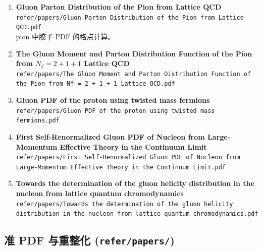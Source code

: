 \documentclass[12pt,a4paper]{ctexart}
\begin{document}
\begin{enumerate}
    \item \textbf{Gluon Parton Distribution of the Pion from Lattice QCD} \\
    \texttt{refer/papers/Gluon Parton Distribution of the Pion from Lattice QCD.pdf} \\
     pion 中胶子 PDF 的格点计算。

    \item \textbf{The Gluon Moment and Parton Distribution Function of the Pion from $N_f = 2 + 1 + 1$ Lattice QCD} \\
    \texttt{refer/papers/The Gluon Moment and Parton Distribution Function of the Pion from Nf = 2 + 1 + 1 Lattice QCD.pdf}

    \item \textbf{Gluon PDF of the proton using twisted mass fermions} \\
    \texttt{refer/papers/Gluon PDF of the proton using twisted mass fermions.pdf}

    \item \textbf{First Self-Renormalized Gluon PDF of Nucleon from Large-Momentum Effective Theory in the Continuum Limit} \\
    \texttt{refer/papers/First Self-Renormalized Gluon PDF of Nucleon from Large-Momentum Effective Theory in the Continuum Limit.pdf}

    \item \textbf{Towards the determination of the gluon helicity distribution in the nucleon from lattice quantum chromodynamics} \\
    \texttt{refer/papers/Towards the determination of the gluon helicity distribution in the nucleon from lattice quantum chromodynamics.pdf}
\end{enumerate}

\subsection{准 PDF 与重整化 (\texttt{refer/papers/})}
\end{document}
